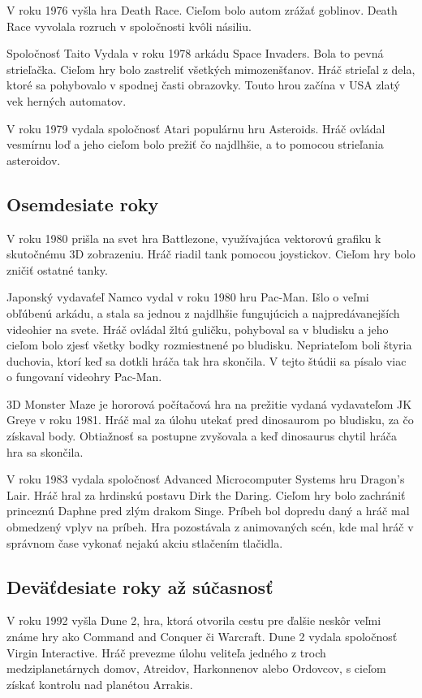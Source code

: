 \documentclass[10pt,oneside,slovak,a4paper]{article}
\begin{document}
V roku 1976 vyšla hra Death Race. Cieľom bolo autom zrážať goblinov. Death Race vyvolala rozruch v spoločnosti kvôli násiliu.

Spoločnosť Taito Vydala v roku 1978 arkádu Space Invaders. Bola to pevná strieľačka. Cieľom hry bolo zastreliť všetkých mimozenšťanov. Hráč strieľal z dela, ktoré sa pohybovalo v spodnej časti obrazovky. Touto hrou začína v USA zlatý vek herných automatov.

V roku 1979 vydala spoločnosť Atari populárnu hru Asteroids. Hráč ovládal vesmírnu loď a jeho cieľom bolo prežiť čo najdlhšie, a to pomocou strieľania asteroidov.



\subsection{Osemdesiate roky} \label{osemdesiate}
V roku 1980 prišla na svet hra Battlezone, využívajúca vektorovú grafiku k skutočnému 3D zobrazeniu. Hráč riadil tank pomocou joystickov. Cieľom hry bolo zničiť ostatné tanky.

Japonský vydavaťeľ Namco vydal v roku 1980 hru Pac-Man. Išlo o veľmi obľúbenú arkádu, a stala sa jednou z najdlhšie fungujúcich a najpredávanejších videohier na svete. Hráč ovládal žltú guličku, pohyboval sa v bludisku a jeho cieľom bolo zjesť všetky bodky rozmiestnené po bludisku. Nepriateľom boli štyria duchovia, ktorí keď sa dotkli hráča tak hra skončila. V tejto štúdii sa písalo viac o fungovaní videohry Pac-Man\cite{SRVSS20}.

3D Monster Maze je hororová počítačová hra na prežitie vydaná vydavateľom JK Greye v roku 1981. Hráč mal za úlohu utekať pred dinosaurom po bludisku, za čo získaval body. Obtiažnosť sa postupne zvyšovala a keď dinosaurus chytil hráča hra sa skončila.

V roku 1983 vydala spoločnosť Advanced Microcomputer Systems hru Dragon's Lair. Hráč hral za hrdinskú postavu Dirk the Daring. Cieľom hry bolo zachrániť princeznú Daphne pred zlým drakom Singe. Príbeh bol dopredu daný a hráč mal obmedzený vplyv na príbeh. Hra pozostávala z animovaných scén, kde mal hráč v správnom čase vykonať nejakú akciu stlačením tlačidla.

\subsection{Deväťdesiate roky až súčasnosť} \label{devatdesiate}
V roku 1992 vyšla Dune 2, hra, ktorá otvorila cestu pre ďalšie neskôr veľmi známe hry ako Command and Conquer či Warcraft. Dune 2 vydala spoločnosť Virgin Interactive. Hráč prevezme úlohu veliteľa jedného z troch medziplanetárnych domov, Atreidov, Harkonnenov alebo Ordovcov, s cieľom získať kontrolu nad planétou Arrakis.
\end{document}
